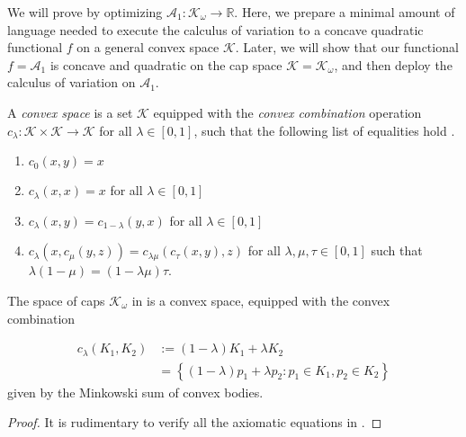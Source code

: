 We will prove  by optimizing \(\mathcal{A}_1 : \mathcal{K}_\omega \to \mathbb{R}\). Here, we prepare a minimal amount of language needed to execute the calculus of variation to a concave quadratic functional \(f\) on a general convex space \(\mathcal{K}\). Later, we will show that our functional \(f = \mathcal{A}_1\) is concave and quadratic on the cap space \(\mathcal{K} = \mathcal{K}_\omega\), and then deploy the calculus of variation on \(\mathcal{A}_1\).

\begin{definition}

A \emph{convex space} is a set \(\mathcal{K}\) equipped with the \emph{convex combination} operation \(c_\lambda : \mathcal{K} \times \mathcal{K} \to \mathcal{K}\) for all \(\lambda \in [0, 1]\), such that the following list of equalities hold \cite{nlab-convex-space}.

\begin{enumerate}
\def\labelenumi{\arabic{enumi}.}
\tightlist
\item
  \(c_0(x, y) = x\)
\item
  \(c_\lambda(x, x) = x\) for all \(\lambda \in [0, 1]\)
\item
  \(c_\lambda (x, y) = c_{1 - \lambda}(y, x)\) for all \(\lambda \in [0, 1]\)
\item
  \(c_\lambda(x, c_\mu(y, z)) = c_{\lambda \mu} (c_\tau(x, y), z)\) for all \(\lambda, \mu, \tau \in [0, 1]\) such that \(\lambda (1 - \mu) = (1 - \lambda \mu) \tau\).
\end{enumerate}

\label{def:convex-space}
\end{definition}

\begin{proposition}

The space of caps \(\mathcal{K}_\omega\) in  is a convex space, equipped with the convex combination

\begin{align*}
c_\lambda(K_1, K_2) & := (1 - \lambda)K_1 + \lambda K_2 \\
& = \left\{ (1 - \lambda) p_1 + \lambda p_2 : p_1 \in K_1, p_2 \in K_2 \right\} 
\end{align*}
given by the Minkowski sum of convex bodies.

\label{pro:cap-space-convex-space}
\end{proposition}

\begin{proof}
It is rudimentary to verify all the axiomatic equations in .
\end{proof}

